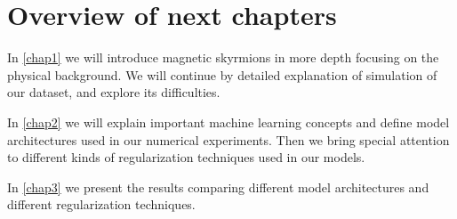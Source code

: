 \section*{Overview of next chapters}

In \autoref{chap1} we will introduce magnetic skyrmions in more depth focusing on the physical background. We will continue by detailed explanation of simulation of our dataset, and explore its difficulties.


In \autoref{chap2} we will explain important machine learning concepts and define model architectures used in our numerical experiments. Then we bring special attention to different kinds of regularization techniques used in our models.


In \autoref{chap3} we present the results comparing different model architectures and different regularization techniques.

